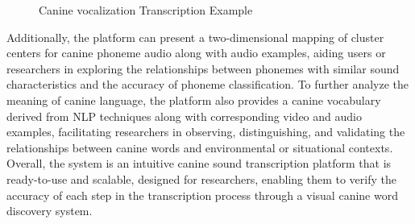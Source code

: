 \begin{figure}[th]
    \centering
	\caption{Canine vocalization Transcription Example}
    \label{fig:intro1}
\end{figure}




Additionally, the platform can present a two-dimensional mapping of cluster centers for canine phoneme audio along with audio examples, aiding users or researchers in exploring the relationships between phonemes with similar sound characteristics and the accuracy of phoneme classification. To further analyze the meaning of canine language, the platform also provides a canine vocabulary derived from NLP techniques along with corresponding video and audio examples, facilitating researchers in observing, distinguishing, and validating the relationships between canine words and environmental or situational contexts. Overall, the system is an intuitive canine sound transcription platform that is ready-to-use and scalable, designed for researchers, enabling them to verify the accuracy of each step in the transcription process through a visual canine word discovery system.


